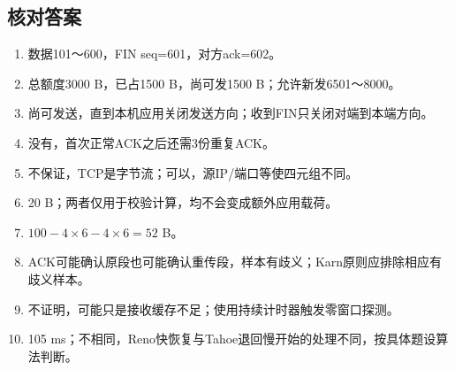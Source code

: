 \subsection{核对答案}\label{CN05-review-answers}

\begin{enumerate}
\def\labelenumi{\arabic{enumi}.}
\tightlist
\item
  数据101～600，FIN seq=601，对方ack=602。
\item
  总额度3000 B，已占1500 B，尚可发1500 B；允许新发6501～8000。
\item
  尚可发送，直到本机应用关闭发送方向；收到FIN只关闭对端到本端方向。
\item
  没有，首次正常ACK之后还需3份重复ACK。
\item
  不保证，TCP是字节流；可以，源IP/端口等使四元组不同。
\item
  20 B；两者仅用于校验计算，均不会变成额外应用载荷。
\item
  \(100-4\times6-4\times6=52\) B。
\item
  ACK可能确认原段也可能确认重传段，样本有歧义；Karn原则应排除相应有歧义样本。
\item
  不证明，可能只是接收缓存不足；使用持续计时器触发零窗口探测。
\item
  105 ms；不相同，Reno快恢复与Tahoe退回慢开始的处理不同，按具体题设算法判断。
\end{enumerate}
